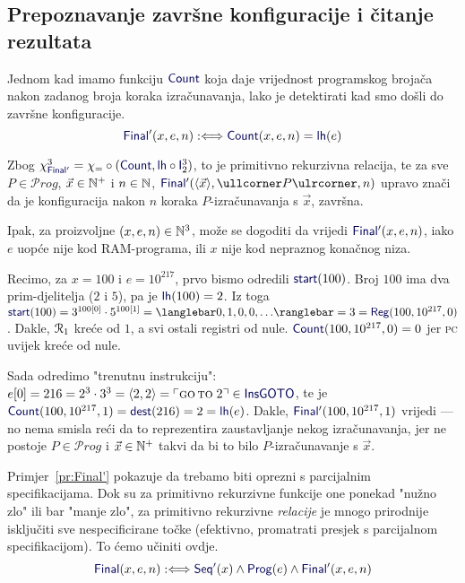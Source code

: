 \subsection{Prepoznavanje završne konfiguracije i čitanje rezultata}

Jednom kad imamo funkciju $\f{Count}$ koja daje vrijednost programskog brojača nakon zadanog broja koraka izračunavanja, lako je detektirati kad smo došli do završne konfiguracije.
\begin{equation}
    \f{Final}'(x,e,n):\Longleftrightarrow\f{Count}(x,e,n)=\f{lh}(e)
\end{equation}

Zbog $\chi_{\f{Final}'}^3=\chi_=\circ(\f{Count},\f{lh}\circ\f I_2^3)$, to je primitivno rekurzivna relacija, te za sve $P\in\mathcal Prog$, $\vec x\in{\mathbb N}^+$ i $n\in{\mathbb N}$, $\f{Final}'(\langle\vec x\rangle,\kprog P,n)$ upravo znači da je konfiguracija nakon $n$ koraka $P$-izračunavanja s $\vec x$, završna.

Ipak, za proizvoljne $(x,e,n)\in{\mathbb N}^3$, može se dogoditi da vrijedi $\f{Final}'(x,e,n)$, iako $e$ uopće nije kod RAM-programa, ili $x$ nije kod nepraznog konačnog niza.

\begin{primjer}\label{pr:Final'}
Recimo, za $x=100$ i $e=10^{217}$, prvo bismo odredili
$\f{start}(100)$. Broj $100$ ima dva prim-djelitelja ($2$ i $5$), pa je $\f{lh}(100)=2$. Iz toga $\f{start}(100)=3^{100[0]}\cdot5^{100[1]}=\knk{0,1,0,0,\dotsc}=3=\f{Reg}(100,10^{217},0)$. Dakle, $\mathcal R_{1}$ kreće od $1$, a svi ostali registri od nule.  $\f{Count}(100,10^{217},0)=0$ jer \textsc{pc} uvijek kreće od nule.

Sada odredimo "trenutnu instrukciju": $e[0]=216=2^3\cdot3^3=\langle2,2\rangle=\kins{\goto\;2}\in\f{InsGOTO}$, te je $\f{Count}(100,10^{217},1)=\f{dest}(216)=2=\f{lh}(e)$. Dakle, $\f{Final}'(100,10^{217},1)$ vrijedi --- no nema smisla reći da to reprezentira zaustavljanje nekog iz\-ra\-ču\-na\-va\-nja, jer ne postoje $P\in\mathcal Prog$ i $\vec x\in{\mathbb N}^+$ takvi da bi to bilo $P$-izračunavanje s $\vec x$.
\end{primjer}

Primjer~\ref{pr:Final'} pokazuje da trebamo biti oprezni s parcijalnim specifikacijama. Dok su za primitivno rekurzivne funkcije one ponekad "nužno zlo" ili bar "manje zlo", za primitivno rekurzivne \emph{relacije} je mnogo prirodnije isključiti sve nespecificirane točke (efektivno, promatrati presjek s parcijalnom specifikacijom). To ćemo učiniti ovdje.
\begin{equation}
\f{Final}(x,e,n):\Longleftrightarrow\f{Seq'}(x)\land\f{Prog}(e)\land\f{Final}'(x,e,n)
\end{equation}

